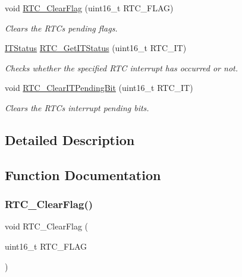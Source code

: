 \begin{DoxyCompactItemize}
void \mbox{\hyperlink{group___r_t_c___private___functions_gacefb05730a77ffaa273c1ac3ade1a22f}{R\+T\+C\+\_\+\+Clear\+Flag}} (uint16\+\_\+t R\+T\+C\+\_\+\+F\+L\+AG)
\begin{DoxyCompactList}\small\item\em Clears the R\+TC\textquotesingle{}s pending flags. \end{DoxyCompactList}\item 
\mbox{\hyperlink{group___exported__types_gaacbd7ed539db0aacd973a0f6eca34074}{I\+T\+Status}} \mbox{\hyperlink{group___r_t_c___private___functions_ga23274ad8aa28e86d5b0d58eee295db21}{R\+T\+C\+\_\+\+Get\+I\+T\+Status}} (uint16\+\_\+t R\+T\+C\+\_\+\+IT)
\begin{DoxyCompactList}\small\item\em Checks whether the specified R\+TC interrupt has occurred or not. \end{DoxyCompactList}\item 
void \mbox{\hyperlink{group___r_t_c___private___functions_ga62b9a04d89a11f28db7dcfd50d9ee768}{R\+T\+C\+\_\+\+Clear\+I\+T\+Pending\+Bit}} (uint16\+\_\+t R\+T\+C\+\_\+\+IT)
\begin{DoxyCompactList}\small\item\em Clears the R\+TC\textquotesingle{}s interrupt pending bits. \end{DoxyCompactList}\end{DoxyCompactItemize}


\subsection{Detailed Description}


\subsection{Function Documentation}
\mbox{\label{group___r_t_c___private___functions_gacefb05730a77ffaa273c1ac3ade1a22f}} 
\subsubsection{\texorpdfstring{RTC\_ClearFlag()}{RTC\_ClearFlag()}}
{\footnotesize\ttfamily void R\+T\+C\+\_\+\+Clear\+Flag (\begin{DoxyParamCaption}\item[{uint16\+\_\+t}]{R\+T\+C\+\_\+\+F\+L\+AG }\end{DoxyParamCaption})}



